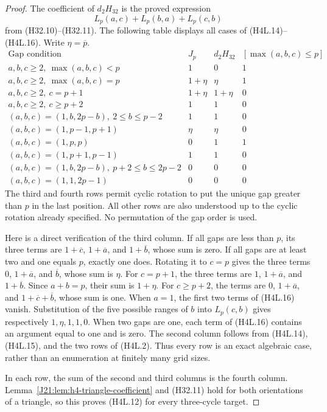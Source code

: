 \documentclass[11pt,oneside]{report}
\theoremstyle{definition}
\numberwithin{equation}{section}
\begin{document}
\begin{proof}
The coefficient of $d_2H_{32}$ is the proved expression
\[
                L_p(a,c)+L_p(b,a)+L_p(c,b)
 \tag{H4L.16}
\]
from (H32.10)--(H32.11).
The following table displays all cases of (H4L.14)--(H4L.16).
Write $\eta=\overline p$.
\[
\begin{array}{c|c|c|c}
 \text{Gap condition}&J_p&d_2H_{32}&[\max(a,b,c)\leq p]\\ \hline
 a,b,c\geq2,\ \max(a,b,c)<p&1&0&1\\
 a,b,c\geq2,\ \max(a,b,c)=p&1+\eta&\eta&1\\
 a,b,c\geq2,\ c=p+1&1+\eta&1+\eta&0\\
 a,b,c\geq2,\ c\geq p+2&1&1&0\\ \hline
 (a,b,c)=(1,b,2p-b),\ 2\leq b\leq p-2&1&1&0\\
 (a,b,c)=(1,p-1,p+1)&\eta&\eta&0\\
 (a,b,c)=(1,p,p)&0&1&1\\
 (a,b,c)=(1,p+1,p-1)&1&1&0\\
 (a,b,c)=(1,b,2p-b),\ p+2\leq b\leq2p-2&0&0&0\\ \hline
 (a,b,c)=(1,1,2p-1)&0&0&0
\end{array}
 \tag{H4L.17}
\]
The third and fourth rows permit cyclic rotation to put the unique
gap greater than $p$ in the last position.
All other rows are also understood up to the cyclic rotation already
specified. No permutation of the gap order is used.

Here is a direct verification of the third column.
If all gaps are less than $p$, its three terms are
$1+\overline c$, $1+\overline a$, and $1+\overline b$,
whose sum is zero.
If all gaps are at least two and one equals $p$, exactly one does.
Rotating it to $c=p$ gives the three terms
$0$, $1+\overline a$, and $\overline b$, whose sum is $\eta$.
For $c=p+1$, the three terms are
$1$, $1+\overline a$, and $1+\overline b$.
Since $a+b=p$, their sum is $1+\eta$.
For $c\geq p+2$, the terms are
$0$, $1+\overline a$, and
$1+\overline c+\overline b$, whose sum is one.
When $a=1$, the first two terms of (H4L.16) vanish.
Substitution of the five possible ranges of $b$ into $L_p(c,b)$
gives respectively $1,\eta,1,1,0$.
When two gaps are one, each term of (H4L.16) contains an argument
equal to one and is zero.
The second column follows from (H4L.14), (H4L.15), and the two rows
of (H4L.2).
Thus every row is an exact algebraic case, rather than an enumeration
at finitely many grid sizes.

In each row, the sum of the second and third columns is the fourth
column. Lemma~\ref{J21:lem:h4-triangle-coefficient} and (H32.11) hold
for both orientations of a triangle, so this proves (H4L.12) for
every three-cycle target.
\end{proof}
\end{document}
